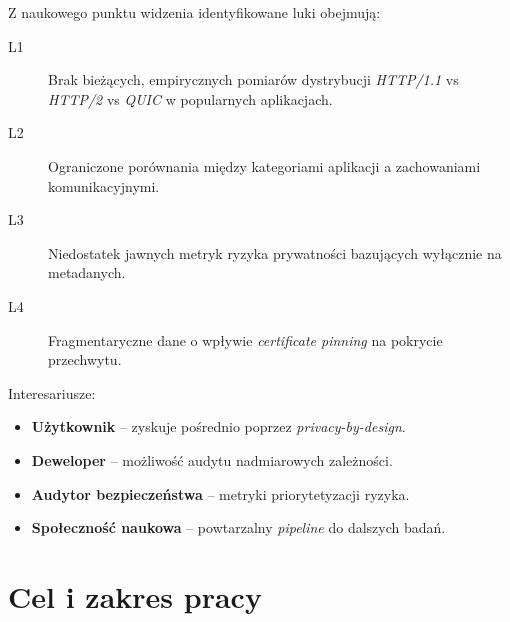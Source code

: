 Z naukowego punktu widzenia identyfikowane luki obejmują:
\begin{description}
  \item[L1] Brak bieżących, empirycznych pomiarów dystrybucji \emph{HTTP/1.1} vs \emph{HTTP/2} vs \emph{QUIC} w popularnych aplikacjach.
  \item[L2] Ograniczone porównania między kategoriami aplikacji a zachowaniami komunikacyjnymi.
  \item[L3] Niedostatek jawnych metryk ryzyka prywatności bazujących wyłącznie na metadanych.
  \item[L4] Fragmentaryczne dane o wpływie \emph{certificate pinning} na pokrycie przechwytu.
\end{description}

Interesariusze:
\begin{itemize}
  \item \textbf{Użytkownik} – zyskuje pośrednio poprzez \emph{privacy-by-design}.
  \item \textbf{Deweloper} – możliwość audytu nadmiarowych zależności.
  \item \textbf{Audytor bezpieczeństwa} – metryki priorytetyzacji ryzyka.
  \item \textbf{Społeczność naukowa} – powtarzalny \emph{pipeline} do dalszych badań.
\end{itemize}

\section{Cel i zakres pracy}

